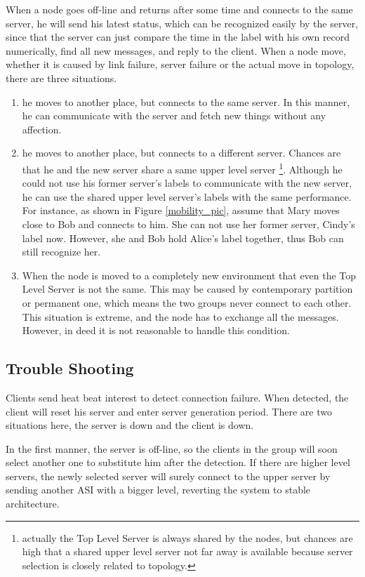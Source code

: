 \documentclass[conference]{IEEEtran}
\begin{document}
When a node goes off-line and returns after some time and connects to the same server,
he will send his latest status, which can be recognized easily by the server,
since that the server can just compare the time in the label with his own record numerically,
find all new messages, and reply to the client.
When a node move, whether it is caused by link failure,
server failure or the actual move in topology, there are three situations.
\begin{enumerate}{}
	\item he moves to another place, but connects to the same server.
In this manner, he can communicate with the server and fetch new things without any affection.
	\item he moves to another place, but connects to a different server.
Chances are that he and the new server share a same upper level server
\footnote{actually the Top Level Server is always shared by the nodes,
but chances are high that a shared upper level server not far away is available
because server selection is closely related to topology.}.
Although he could not use his former server's labels to communicate with the new server,
he can use the shared upper level server's labels with the same performance.
For instance, as shown in Figure \ref{mobility_pic},
assume that Mary moves close to Bob and connects to him.
She can not use her former server, Cindy's label now.
However, she and Bob hold Alice's label together, thus Bob can still recognize her.
	\item When the node is moved to a completely new environment that even the Top Level Server is not the same.
This may be caused by contemporary partition or permanent one,
which means the two groups never connect to each other. This situation is extreme,
and the node has to exchange all the messages.
However, in deed it is not reasonable to handle this condition.
\end{enumerate}

\subsection{Trouble Shooting}
\label{trouble_shooting}
Clients send heat beat interest to detect connection failure.
When detected, the client will reset his server and enter server generation period.
There are two situations here, the server is down and the client is down.

In the first manner, the server is off-line,
so the clients in the group will soon select another one to substitute him after the detection.
If there are higher level servers,
the newly selected server will surely connect to the upper server by sending another
ASI with a bigger level, reverting the system to stable architecture.
\end{document}
